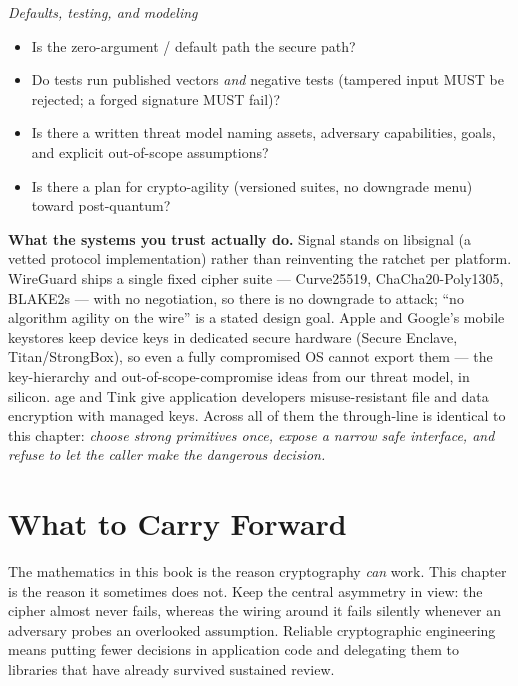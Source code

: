 \begin{focusbox}
\emph{Defaults, testing, and modeling}
\begin{itemize}
  \item Is the zero-argument / default path the secure path?
  \item Do tests run published vectors \emph{and} negative tests (tampered input
  MUST be rejected; a forged signature MUST fail)?
  \item Is there a written threat model naming assets, adversary capabilities,
  goals, and explicit out-of-scope assumptions?
  \item Is there a plan for crypto-agility (versioned suites, no downgrade menu)
  toward post-quantum?
\end{itemize}
\end{focusbox}

\begin{applicationbox}
\textbf{What the systems you trust actually do.} Signal stands on libsignal (a
vetted protocol implementation) rather than reinventing the ratchet per platform.
WireGuard ships a single fixed cipher suite --- Curve25519, ChaCha20-Poly1305,
BLAKE2s --- with no negotiation, so there is no downgrade to attack; ``no algorithm
agility on the wire'' is a stated design goal. Apple and Google's mobile keystores
keep device keys in dedicated secure hardware (Secure Enclave, Titan/StrongBox), so
even a fully compromised OS cannot export them --- the key-hierarchy and
out-of-scope-compromise ideas from our threat model, in silicon. age and Tink give
application developers misuse-resistant file and data encryption with managed keys.
Across all of them the through-line is identical to this chapter: \emph{choose
strong primitives once, expose a narrow safe interface, and refuse to let the caller
make the dangerous decision.}
\end{applicationbox}

\section{What to Carry Forward}
\label{ch39:carry-forward}

The mathematics in this book is the reason cryptography \emph{can} work. This
chapter is the reason it sometimes does not. Keep the central asymmetry in view:
the cipher almost never fails, whereas the wiring around it fails silently whenever
an adversary probes an overlooked assumption. Reliable cryptographic engineering
means putting fewer decisions in application code and delegating them to libraries
that have already survived sustained review.

